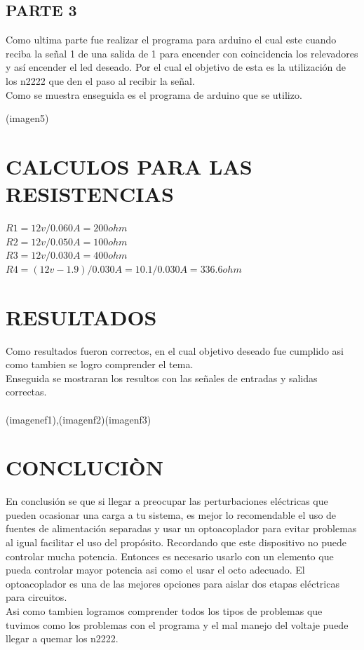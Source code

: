 \documentclass[12pt,letterpaper]{article}
\begin{document}
	\subsection{PARTE 3}
	Como ultima parte fue realizar el programa para arduino el cual este cuando reciba la señal 1 de una salida de 1 para encender con coincidencia los relevadores y así encender el led deseado. Por  el cual el objetivo de esta es la utilización de los n2222 que den el paso al recibir la señal.\\
	Como se muestra enseguida es el programa de arduino que se utilizo.
	\begin{center}
		(imagen5)
	\end{center}

\section{CALCULOS PARA LAS RESISTENCIAS}

	\begin{center}\textbf
		{
			$ R1=12v/0.060A=200ohm $\\
			$ R2=12v/0.050A=100ohm $\\
			$ R3=12v/0.030A=400ohm $\\
			$ R4=(12v-1.9)/0.030A=10.1/0.030A=336.6ohm $\\
		}
		
	\end{center}
	
\section{RESULTADOS}
	Como resultados fueron correctos, en el cual objetivo deseado fue cumplido asi como tambien se logro comprender el tema.\\
	Enseguida se mostraran los resultos con las señales de entradas y salidas correctas.\\\\
	
	(imagenef1),(imagenf2)(imagenf3)
	
\section{CONCLUCIÒN}
	En conclusión se que si llegar a preocupar las perturbaciones eléctricas que pueden ocasionar una carga a tu sistema, es mejor lo recomendable el uso de fuentes de alimentación separadas y usar un optoacoplador para evitar problemas al igual facilitar el uso del propósito. Recordando que este dispositivo no puede controlar mucha potencia. Entonces es necesario usarlo con un elemento que pueda controlar mayor potencia asi como el usar el octo adecuado. El optoacoplador es una de las mejores opciones para aislar dos etapas eléctricas para circuitos.\\
	Asi como tambien logramos comprender todos los tipos de problemas que tuvimos como los problemas con el programa y el mal manejo del voltaje puede llegar a quemar los n2222.
	
\end{document}
